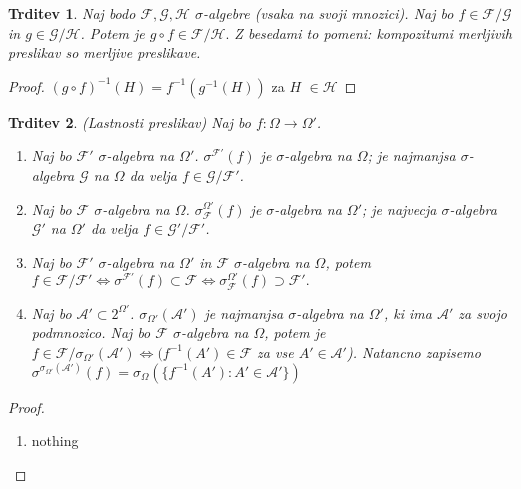 \documentclass[a4paper,12pt]{article}
\newtheorem{trditev}{Trditev}
\newcommand{\F}{\mathcal{F}}
\newcommand{\A}{\mathcal{A}}
\begin{document}
            \begin{trditev}
                Naj bodo $\F, \mathcal{G}, \mathcal{H}$ $\sigma$-algebre (vsaka na svoji mnozici). Naj bo $f \in \F/\mathcal{G}$ in $g \in \mathcal{G}/\mathcal{H}$. Potem je $g \circ f \in \F/\mathcal{H}.$ Z besedami to pomeni: kompozitumi merljivih preslikav so merljive preslikave.
            \end{trditev}

            \begin{proof}
                $(g \circ f)^{-1}(H) = f^{-1}(g^{-1}(H))$ za $H$ $\in \mathcal{H}$
            \end{proof}

            \begin{trditev} (Lastnosti preslikav)
                Naj bo $f: \Omega \rightarrow \Omega'$.
                \begin{enumerate}
                    \item Naj bo $\F'$ $\sigma$-algebra na $\Omega'$. $\sigma^{\F'}(f)$ je $\sigma$-algebra na $\Omega$; je najmanjsa $\sigma$-algebra $\mathcal{G}$ na $\Omega$ da velja $f \in \mathcal{G}/\F'$.
                    \item Naj bo $\F$ $\sigma$-algebra na $\Omega$. $\sigma_{\F}^{\Omega'}(f)$ je $\sigma$-algebra na $\Omega'$; je najvecja $\sigma$-algebra $\mathcal{G}'$ na $\Omega'$ da velja $f \in \mathcal{G}'/\F'$.
                    \item Naj bo $\F'$ $\sigma$-algebra na $\Omega'$ in $\F$ $\sigma$-algebra na $\Omega$, potem $f \in \F/\F' \iff \sigma^{\F'}(f) \subset \F \iff \sigma_{\F}^{\Omega'}(f) \supset \F'.$
                    \item Naj bo $\A' \subset 2^{\Omega'}$. $\sigma_{\Omega'}(\A')$ je najmanjsa $\sigma$-algebra na $\Omega'$, ki ima $\A'$ za svojo podmnozico. Naj bo $\F$ $\sigma$-algebra na $\Omega$, potem je $f \in \F/\sigma_{\Omega'}(\A') \iff (f^{-1}(A') \in \F$ za vse $A' \in \A'$). Natancno zapisemo $\sigma^{\sigma_{\Omega'}(\A')}(f) = \sigma_\Omega(\{f^{-1}(A'):A' \in \A'\})$
                \end{enumerate}
            \end{trditev}

            \begin{proof}
                \begin{enumerate}
                    \item nothing
                \end{enumerate}
            \end{proof}
\end{document}
